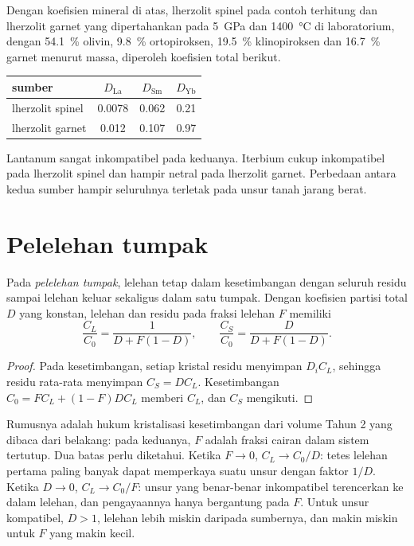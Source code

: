 Dengan koefisien mineral di atas, lherzolit spinel pada contoh terhitung dan
lherzolit garnet yang dipertahankan pada \qty{5}{GPa} dan
\qty{1400}{\celsius} di laboratorium, dengan \qty{54.1}{\percent} olivin,
\qty{9.8}{\percent} ortopiroksen, \qty{19.5}{\percent} klinopiroksen dan
\qty{16.7}{\percent} garnet menurut massa, diperoleh koefisien total berikut.
\begin{center}
\small
\begin{tabular}{lccc}
\hline
sumber & $D_{\mathrm{La}}$ & $D_{\mathrm{Sm}}$ & $D_{\mathrm{Yb}}$ \\
\hline
lherzolit spinel & 0.0078 & 0.062 & 0.21 \\
lherzolit garnet & 0.012 & 0.107 & 0.97 \\
\hline
\end{tabular}
\end{center}
Lantanum sangat inkompatibel pada keduanya. Iterbium cukup inkompatibel
pada lherzolit spinel dan hampir netral pada lherzolit garnet. Perbedaan
antara kedua sumber hampir seluruhnya terletak pada unsur tanah jarang
berat.

\section{Pelelehan tumpak}\label{sec:b3:trace-element-modelling:batch}

\begin{theorem}\label{thm:b3:trace-element-modelling:batch}
Pada \emph{pelelehan tumpak}, lelehan tetap dalam kesetimbangan
dengan seluruh residu sampai lelehan keluar sekaligus dalam satu tumpak. Dengan
koefisien partisi total $D$ yang konstan, lelehan dan residu pada fraksi lelehan $F$
memiliki
\[
\frac{C_L}{C_0} = \frac{1}{D + F(1 - D)}, \qquad
\frac{C_S}{C_0} = \frac{D}{D + F(1 - D)}.
\]
\end{theorem}

\begin{proof}
Pada kesetimbangan, setiap kristal residu menyimpan $D_iC_L$, sehingga residu
rata-rata menyimpan $C_S = DC_L$. Kesetimbangan $C_0 = FC_L + (1 - F)DC_L$
memberi $C_L$, dan $C_S$ mengikuti.
\end{proof}

Rumusnya adalah hukum kristalisasi kesetimbangan dari volume Tahun 2 yang dibaca
dari belakang: pada keduanya, $F$ adalah fraksi cairan dalam sistem tertutup. Dua
batas perlu diketahui. Ketika $F \to 0$, $C_L \to C_0/D$: tetes lelehan
pertama paling banyak dapat memperkaya suatu unsur dengan faktor $1/D$. Ketika $D \to 0$, $C_L \to
C_0/F$: unsur yang benar-benar inkompatibel terencerkan ke dalam lelehan, dan
pengayaannya hanya bergantung pada $F$. Untuk unsur kompatibel, $D > 1$, lelehan
lebih miskin daripada sumbernya, dan makin miskin untuk $F$ yang makin kecil.

